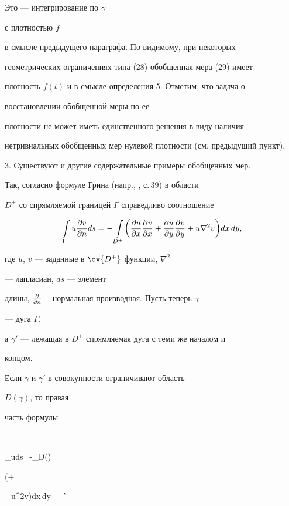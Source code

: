 Это --- интегрирование по $\gamma$ 


с плотностью $f$ 


в смысле предыдущего параграфа. По-видимому, при некоторых 


геометрических ограничениях типа (28) обобщенная мера (29) имеет 


плотность $f(t)$ и в смысле определения 5. Отметим, что задача о 


восстановлении обобщенной меры по ее 


плотности не может иметь единственного решения в виду наличия  


нетривиальных обобщенных мер нулевой плотности (см. предыдущий пункт). 


\medskip 


 


3. Существуют и другие содержательные примеры обобщенных мер. 


Так, согласно формуле Грина (напр., \cite{23}, с.\,39) в области 


$D^+$ со спрямляемой границей $\Gamma$ справедливо соотношение 


$$ 


\intl_\Gamma u\myfrac{v}{n}ds=-\intl_{D^+} 


\biggl(\myfrac{u}{x}\myfrac{v}{x}+\myfrac{u}{y}\myfrac{v}{y} 


+u\nabla^2v\biggr)dx\,dy, 


$$ 


где $u$, $v$ --- заданные в $\ov{D^+}$ функции, $\nabla^2$ 


--- лапласиан, $ds$ --- элемент 


длины, $\frac{\partial }{\partial n}$ -- нормальная производная. Пусть теперь $\gamma$ 


--- дуга $\Gamma$, 


а $\gamma'$ --- лежащая в $D^+$ спрямляемая дуга с теми же началом и 


концом. 


Если $\gamma$ и $\gamma'$ в совокупности ограничивают область 


$D(\gamma)$, то правая 


часть формулы 


$$ 


\intl_\gamma uds=-\iint\limits_{D(\gamma)} 


\biggl(+ 


+u\nabla^2v\biggr)dx\,dy+\intl_{\gamma'} 


